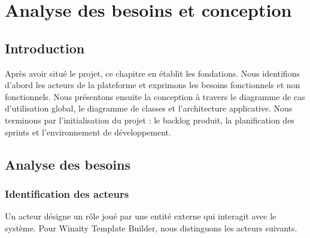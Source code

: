 \chapter{Analyse des besoins et conception}
\label{chap:analyse}

\section*{Introduction}
Après avoir situé le projet, ce chapitre en établit les fondations. Nous
identifions d'abord les acteurs de la plateforme et exprimons les besoins
fonctionnels et non fonctionnels. Nous présentons ensuite la conception à
travers le diagramme de cas d'utilisation global, le diagramme de classes
et l'architecture applicative. Nous terminons par l'initialisation du
projet : le backlog produit, la planification des sprints et
l'environnement de développement.

\section{Analyse des besoins}

\subsection{Identification des acteurs}
Un acteur désigne un rôle joué par une entité externe qui interagit avec le
système. Pour Winaity Template Builder, nous distinguons les acteurs
suivants.

